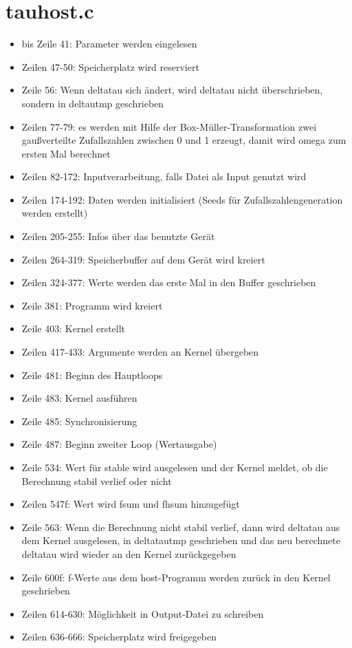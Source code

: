 \documentclass[a4paper,parskip=half,10pt]{scrartcl}
\begin{document}
\section{tauhost.c}
\begin{itemize}
\item bis Zeile 41: Parameter werden eingelesen
\item Zeilen 47-50: Speicherplatz wird reserviert
\item Zeile 56: Wenn deltatau sich ändert, wird deltatau nicht überschrieben, sondern in deltautmp geschrieben
\item Zeilen 77-79: es werden mit Hilfe der Box-Müller-Transformation zwei gaußverteilte Zufallszahlen zwischen 0 und 1 erzeugt, damit wird omega zum ersten Mal berechnet
\item Zeilen 82-172: Inputverarbeitung, falls Datei als Input genutzt wird
\item Zeilen 174-192: Daten werden initialisiert (Seeds für Zufallszahlengeneration werden erstellt)
\item Zeilen 205-255: Infos über das benutzte Gerät
\item Zeilen 264-319: Speicherbuffer auf dem Gerät wird kreiert
\item Zeilen 324-377: Werte werden das erste Mal in den Buffer geschrieben
\item Zeile 381: Programm wird kreiert
\item Zeile 403: Kernel erstellt
\item Zeilen 417-433: Argumente werden an Kernel übergeben
\item Zeile 481: Beginn des Hauptloops
  \item Zeile 483: Kernel ausführen
  \item Zeile 485: Synchronisierung
  \item Zeile 487: Beginn zweiter Loop (Wertausgabe)
\item Zeile 534: Wert für stable wird ausgelesen und der Kernel meldet, ob die Berechnung stabil verlief oder nicht
\item Zeilen 547f: Wert wird fsum und fhsum hinzugefügt
\item Zeile 563: Wenn die Berechnung nicht stabil verlief, dann wird deltatau aus dem Kernel ausgelesen, in deltatautmp geschrieben und das neu berechnete deltatau wird wieder an den Kernel zurückgegeben
\item Zeile 600f: f-Werte aus dem host-Programm werden zurück in den Kernel geschrieben
\item Zeilen 614-630: Möglichkeit in Output-Datei zu schreiben
\item Zeilen 636-666: Speicherplatz wird freigegeben 

\end{itemize}
\end{document}
